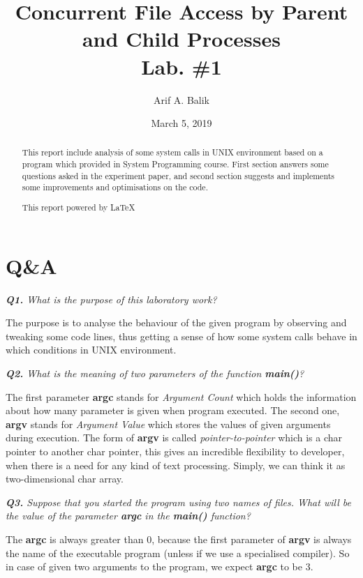 \documentclass[11pt]{article}
\title{Concurrent File Access by Parent and Child Processes \\Lab. \#1}
\author{Arif A. Balik}
\affil{Undergraduate Student\\
	Sytstem Programming\\
	Department of Computer Science\\
	Arel University\\
	Büyükçekmece, İstanbul 34537\\
    Email: arifbalik@outlook.com
}
\date{March 5, 2019}                                           %
\begin{document}
\maketitle

\begin{abstract}
This report include analysis of some system calls in UNIX environment based on a program which provided in System Programming course. First section answers some questions asked in the experiment paper, and second section suggests and implements some improvements and optimisations on the code.

This report powered by \LaTeX{}
\end{abstract}
\section*{Q\&A}

\textit{\textbf{Q1.} What is the purpose of this laboratory work?}
\vspace{5mm}

The purpose is to analyse the behaviour of the given program by observing and tweaking some code lines, thus getting a sense of how some system calls behave in which conditions in UNIX environment.

\vspace{5mm}
\textit{\textbf{Q2.} What is the meaning of two parameters of the function \textbf{main()}?}
\vspace{5mm}

The first parameter \textbf{argc} stands for \textit{Argument Count} which holds the information about how many parameter is given when program executed. The second one, \textbf{argv} stands for \textit{Argument Value} which stores the values of given arguments during execution. The form of \textbf{argv} is called \textit{pointer-to-pointer} which is a char pointer to another char pointer, this gives an incredible flexibility to developer, when there is a need for any kind of text processing. Simply, we can think it as two-dimensional char array.

\vspace{5mm}
\textit{\textbf{Q3.} Suppose that you started the program using two names of files. What will be the value of the parameter \textbf{argc} in the \textbf{main()} function?}
\vspace{5mm}

The \textbf{argc} is always greater than 0, because the first parameter of \textbf{argv} is always the name of the executable program (unless if we use a specialised compiler). So in case of given two arguments to the program, we expect \textbf{argc} to be 3.
\end{document}
